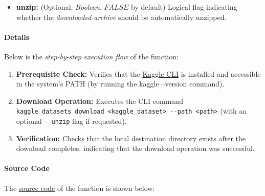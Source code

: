 \documentclass[
]{report}
\providecommand{\tightlist}{%
  \setlength{\itemsep}{0pt}\setlength{\parskip}{0pt}}
\begin{document}
\protect{}\label{func.kaggle_cli.download.args.unzip}
\begin{itemize}
\tightlist
\item
  \textbf{unzip:} (Optional, \emph{Boolean}, \(FALSE\) by default) Logical flag indicating whether the \emph{downloaded archive} should be automatically unzipped.
\end{itemize}

\protect{}\label{func.kaggle_cli.download.details}
\paragraph{Details}\label{details}

\hfill\break

Below is the \emph{step-by-step execution flow} of the function:

\begin{enumerate}
\def\labelenumi{\arabic{enumi}.}
\tightlist
\item
  \textbf{Prerequisite Check:} Verifies that the \href{https://github.com/Kaggle/kaggle-cli/blob/main/docs/datasets.md\#kaggle-datasets-download}{Kaggle CLI} is installed and accessible in the system's PATH (by running the kaggle --version command).
\item
  \textbf{Download Operation:} Executes the CLI command \texttt{kaggle\ datasets\ download\ \textless{}kaggle\_dataset\textgreater{}\ -\/-path\ \textless{}path\textgreater{}} (with an optional \texttt{-\/-unzip} flag if requested).
\item
  \textbf{Verification:} Checks that the local destination directory exists after the download completes, indicating that the download operation was successful.
\end{enumerate}

\newpage

\protect{}\label{func.kaggle_cli.download.code}
\paragraph{Source Code}\label{source-code}

\hfill\break

The \href{https://github.com/AzKurban-edX-DS/edx.capstone.choose-your-own/blob/main/r/support-functions/data-helper.R\#L}{source code} of the function is shown below:
\end{document}
